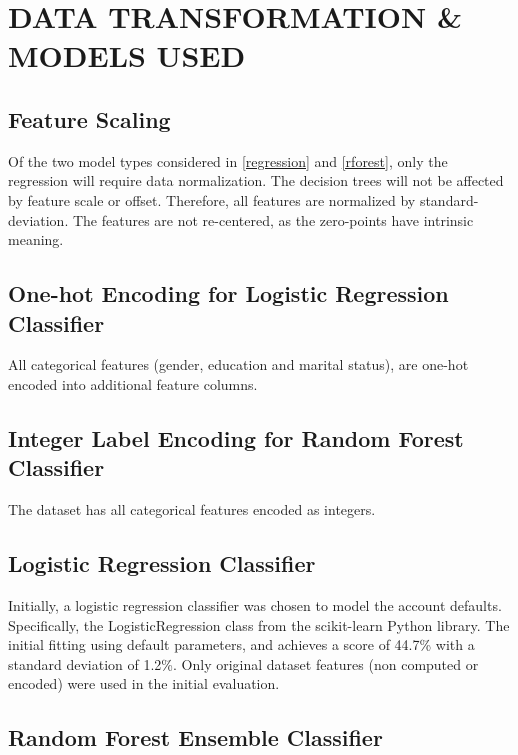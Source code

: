 \documentclass[conference]{IEEEtran}
\begin{document}
\FloatBarrier
\section{DATA TRANSFORMATION \& MODELS USED}

\subsection{Feature Scaling}

Of the two model types considered in \autoref{regression} and
\autoref{rforest}, only the regression will require data normalization. The
decision trees will not be affected by feature scale or offset. Therefore, all
features are normalized by standard-deviation. The features are not
re-centered, as the zero-points have intrinsic meaning.

\subsection{One-hot Encoding for Logistic Regression Classifier}

All categorical features (gender, education and marital status), are one-hot
encoded into additional feature columns.

\subsection{Integer Label Encoding for Random Forest Classifier}

The dataset has all categorical features encoded as integers.

\subsection{Logistic Regression Classifier} \label{regression}

Initially, a logistic regression classifier was chosen to model the account
defaults. Specifically, the LogisticRegression class from the scikit-learn
Python library\cite{sklearn_api}. The initial fitting using default parameters,
and achieves a score of 44.7\% with a standard deviation of 1.2\%. Only
original dataset features (non computed or encoded) were used in the initial
evaluation.

\subsection{Random Forest Ensemble Classifier} \label{rforest}
\end{document}
